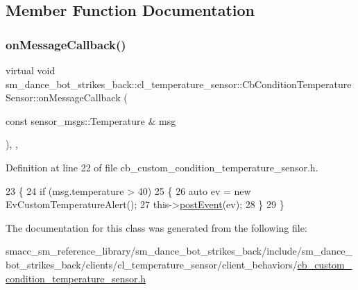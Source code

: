 \subsection{Member Function Documentation}
\mbox{\label{classsm__dance__bot__strikes__back_1_1cl__temperature__sensor_1_1CbConditionTemperatureSensor_a98012d6a2c5469fb95990e726d87d98d}} 
\subsubsection{\texorpdfstring{on\+Message\+Callback()}{onMessageCallback()}}
{\footnotesize\ttfamily virtual void sm\+\_\+dance\+\_\+bot\+\_\+strikes\+\_\+back\+::cl\+\_\+temperature\+\_\+sensor\+::\+Cb\+Condition\+Temperature\+Sensor\+::on\+Message\+Callback (\begin{DoxyParamCaption}\item[{const sensor\+\_\+msgs\+::\+Temperature \&}]{msg }\end{DoxyParamCaption})\hspace{0.3cm}{\ttfamily [inline]}, {\ttfamily [override]}, {\ttfamily [virtual]}}



Definition at line 22 of file cb\+\_\+custom\+\_\+condition\+\_\+temperature\+\_\+sensor.\+h.


\begin{DoxyCode}
23   \{
24     \textcolor{keywordflow}{if} (msg.temperature > 40)
25     \{
26       \textcolor{keyword}{auto} ev = \textcolor{keyword}{new} EvCustomTemperatureAlert();
27       this->\hyperlink{classsmacc_1_1SmaccClientBehavior_a3152cd2215ebc0e387a8a546de07cded}{postEvent}(ev);
28     \}
29   \}
\end{DoxyCode}


The documentation for this class was generated from the following file\+:\begin{DoxyCompactItemize}
\item 
smacc\+\_\+sm\+\_\+reference\+\_\+library/sm\+\_\+dance\+\_\+bot\+\_\+strikes\+\_\+back/include/sm\+\_\+dance\+\_\+bot\+\_\+strikes\+\_\+back/clients/cl\+\_\+temperature\+\_\+sensor/client\+\_\+behaviors/\hyperlink{strikes__back_2include_2sm__dance__bot__strikes__back_2clients_2cl__temperature__sensor_2client_eb3f092c103b572cfc308a919200832c}{cb\+\_\+custom\+\_\+condition\+\_\+temperature\+\_\+sensor.\+h}\end{DoxyCompactItemize}
